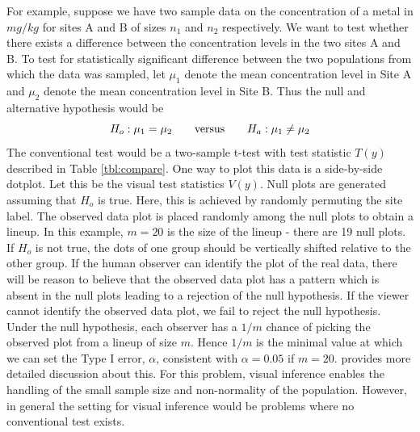 For example, suppose we have two sample data on the concentration of a metal in $mg/kg$ for sites A and B of sizes $n_1$ and $n_2$ respectively. We want to test whether there exists a difference between the concentration levels in the two sites A and B. To test for statistically significant difference between the two populations from which the data was sampled, let $\mu_1$ denote the mean concentration level in Site A and $\mu_2$ denote the mean concentration level in Site B. Thus the null and alternative hypothesis would be
\[
H_o: \mu_1 = \mu_2 \qquad \hbox{versus} \qquad H_a: \mu_1 \ne \mu_2
\]
The conventional test would be a two-sample t-test with test statistic $T(y)$ described in Table \ref{tbl:compare}. One way to plot this data is a side-by-side dotplot. Let this be the visual test statistics $V(y)$. Null plots are generated assuming that $H_o$ is true. Here, this is achieved by randomly permuting the site label. The observed data plot is placed randomly among the null plots to obtain a lineup. In this example, $m = 20$ is the size of the lineup - there are 19 null plots. If $H_o$ is not true, the dots of one group should be vertically shifted relative to the other group. If the human observer can identify the plot of the real data, there will be reason to believe that the observed data plot has a pattern which is absent in the null plots leading to a rejection of the null hypothesis. If the viewer cannot identify the observed data plot, we fail to reject the null hypothesis. Under the null hypothesis, each observer has a $1/m$ chance of picking the observed plot from a lineup of size $m$. Hence $1/m$ is the minimal value at which we can set the Type I error, $\alpha$, consistent with $\alpha = 0.05$ if $m = 20$.  \cite{majumder:2013} provides more detailed discussion about this. For this problem, visual inference enables the handling of the small sample size and non-normality of the population. However, in general the setting for visual inference would be problems where no conventional test exists.
